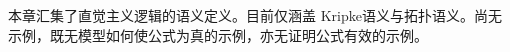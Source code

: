 \documentclass[../../../include/open-logic-chapter]{subfiles}
\begin{document}

\begin{editorial}
  本章汇集了直觉主义逻辑的语义定义。目前仅涵盖 Kripke语义与拓扑语义。尚无示例，既无模型如何使公式为真的示例，亦无证明公式有效的示例。
\end{editorial}


\OLEndChapterHook
\end{document}
